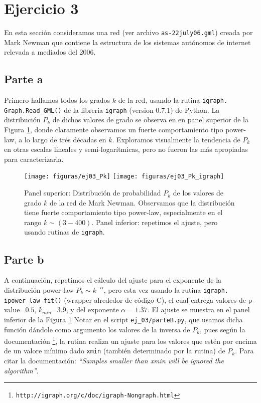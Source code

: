 \section{Ejercicio 3}

En esta secci\'on consideramos una red (ver archivo \texttt{as-22july06.gml}) creada por Mark Newman que contiene la estructura de los sistemas aut\'onomos de internet relevada a mediados del 2006.


\subsection{Parte a}
\def \ScriptA {\texttt{ej\_03/parteA.py}}

Primero hallamos todos los grados $k$ de la red, usando la rutina \texttt{igraph.\\
Graph.Read\_GML()} de la libreria \texttt{igraph} (version 0.7.1) de Python.
La distribuci\'on $P_k$ de dichos valores de grado se observa en en panel superior de la Figura \ref{fig:ej03_1}, donde claramente observamos un fuerte comportamiento tipo power-law, a lo largo de tr\'es d\'ecadas en $k$.
Exploramos visualmente la tendencia de $P_k$ en otras escalas lineales y semi-logar\'itmicas, pero no fueron las m\'as apropiadas para caracterizarla.


\begin{figure}
\centering
\texttt{[image: figuras/ej03\_Pk]}
\texttt{[image: figuras/ej03\_Pk\_igraph]}
\caption{
    Panel superior: Distribuci\'on de probabilidad $P_k$ de los valores de grado $k$ de la red de Mark Newman.
Observamos que la distribuci\'on tiene fuerte comportamiento tipo power-law, especialmente en el rango $k \sim (3-400)$.
    Panel inferior: repetimos el ajuste, pero usando rutinas de \texttt{igraph}.}
\label{fig:ej03_1}
\end{figure}



\subsection{Parte b}
\def \ScriptB {\texttt{ej\_03/parteB.py}}

A continuaci\'on, repetimos el c\'alculo del ajuste para el exponente de la distribuci\'on power-law $P_k \sim k^{-\alpha}$, pero esta vez usando la rutina \texttt{igraph.\\
ipower\_law\_fit()} (wrapper alrededor de c\'odigo C), el cual entrega valores de p-value=$0.5$, $k_{min}$=$3.9$, y del exponente $\alpha=1.37$.
El ajuste se muestra en el panel inferior de la Figura \ref{fig:ej03_1}
Notar en el script \ScriptB, que usamos dicha funci\'on d\'andole como argumento los valores de la inversa de $P_k$, pues seg\'un la documentaci\'on 
\footnote{\texttt{http://igraph.org/c/doc/igraph-Nongraph.html}}, 
la rutina realiza un ajuste para los valores que est\'en por encima de un valore m\'inimo dado \texttt{xmin} (tambi\'en determinado por la rutina) de $P_k$. 
Para citar la documentaci\'on: \textit{``Samples smaller than xmin will be ignored the algorithm''}.




